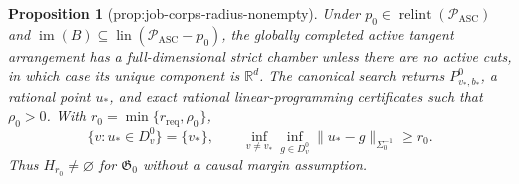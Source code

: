 \documentclass{article}
\newtheorem{proposition}{Proposition}
\begin{document}
\begin{proposition}[prop:job-corps-radius-nonempty]\label{prop:job-corps-radius-nonempty}
Under \(p_0\in\operatorname{relint}(\mathcal P_{\mathrm{ASC}})\) and \(\operatorname{im}(B)\subseteq\operatorname{lin}(\mathcal P_{\mathrm{ASC}}-p_0)\), the globally completed active tangent arrangement has a full-dimensional strict chamber unless there are no active cuts, in which case its unique component is \(\mathbb R^d\).  The canonical search returns \(P_{v_*,b_*}^0\), a rational point \(u_*\), and exact rational linear-programming certificates such that \(\rho_0>0\).  With \(r_0=\min\{r_{\mathrm{req}},\rho_0\}\),
\[
 \{v:u_*\in D_v^0\}=\{v_*\},\qquad
 \inf_{v\ne v_*}\inf_{g\in D_v^0}
 \|u_*-g\|_{\Sigma_0^{-1}}\ge r_0.
\]
Thus \(H_{r_0}\ne\varnothing\) for \(\mathfrak G_0\) without a causal margin assumption.
\end{proposition}
\end{document}
